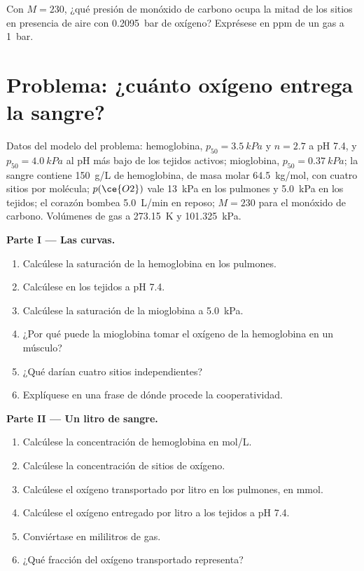 \begin{exercise}[$\star\star\star$]\label{exo:b3:bioinorganic:12}
Con $M = 230$, ¿qué presión de monóxido de carbono ocupa la mitad de los sitios en
presencia de aire con \qty{0.2095}{bar} de oxígeno? Exprésese en ppm de un gas a \qty{1}{bar}.
\end{exercise}

\section{Problema: ¿cuánto oxígeno entrega la sangre?}

\begin{problem}
\label{pb:b3:bioinorganic:1}
Datos del modelo del problema: hemoglobina, $p_{50} = \qty{3.5}{kPa}$ y $n = 2.7$ a pH 7.4, y $p_{50} = \qty{4.0}{kPa}$ al
pH más bajo de los tejidos activos; mioglobina, $p_{50} = \qty{0.37}{kPa}$; la sangre contiene \qty{150}{g/L} de
hemoglobina, de masa molar \qty{64.5}{kg/mol}, con cuatro sitios por molécula; $p(\ce{O2})$ vale \qty{13}{kPa}
en los pulmones y \qty{5.0}{kPa} en los tejidos; el corazón bombea \qty{5.0}{L/min} en reposo;
$M = 230$ para el monóxido de carbono. Volúmenes de gas a \qty{273.15}{K} y \qty{101.325}{kPa}.

\medskip\noindent\textbf{Parte I --- Las curvas.}
\begin{enumerate}
  \item Calcúlese la saturación de la hemoglobina en los pulmones.
  \item Calcúlese en los tejidos a pH 7.4.
  \item Calcúlese la saturación de la mioglobina a \qty{5.0}{kPa}.
  \item ¿Por qué puede la mioglobina tomar el oxígeno de la hemoglobina en un músculo?
  \item ¿Qué  darían cuatro sitios independientes?
  \item Explíquese en una frase de dónde procede la cooperatividad.
\end{enumerate}

\medskip\noindent\textbf{Parte II --- Un litro de sangre.}
\begin{enumerate}[resume]
  \item Calcúlese la concentración de hemoglobina en mol/L.
  \item Calcúlese la concentración de sitios de oxígeno.
  \item Calcúlese el oxígeno transportado por litro en los pulmones, en mmol.
  \item Calcúlese el oxígeno entregado por litro a los tejidos a pH 7.4.
  \item Conviértase en mililitros de gas.
  \item ¿Qué fracción del oxígeno transportado representa?
\end{enumerate}


\end{problem}
